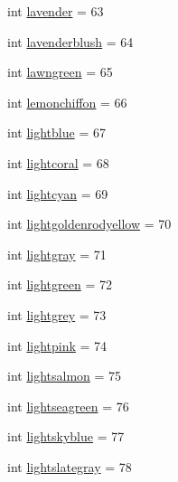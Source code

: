 \begin{DoxyCompactItemize}
\item 
int \mbox{\hyperlink{classbridges_1_1named__color_1_1_named_color_aa7424f36843ba0a7712836bddb048e64}{lavender}} = 63
\item 
int \mbox{\hyperlink{classbridges_1_1named__color_1_1_named_color_a9c3db166dddbac046a0fcc51d0285864}{lavenderblush}} = 64
\item 
int \mbox{\hyperlink{classbridges_1_1named__color_1_1_named_color_a2c267420ee73d46609a48db2d78fc843}{lawngreen}} = 65
\item 
int \mbox{\hyperlink{classbridges_1_1named__color_1_1_named_color_a77e4011bdf8fc70456c2ff197b78d7b5}{lemonchiffon}} = 66
\item 
int \mbox{\hyperlink{classbridges_1_1named__color_1_1_named_color_a66aba171251724a6fc4ba180a4ff78d6}{lightblue}} = 67
\item 
int \mbox{\hyperlink{classbridges_1_1named__color_1_1_named_color_a35c91829cf18d0f8a2892411bae23eda}{lightcoral}} = 68
\item 
int \mbox{\hyperlink{classbridges_1_1named__color_1_1_named_color_af52d155b6ef4eed72f56f95df59d9125}{lightcyan}} = 69
\item 
int \mbox{\hyperlink{classbridges_1_1named__color_1_1_named_color_a316d825baa9306e4f3ccb9aabbe0a6cc}{lightgoldenrodyellow}} = 70
\item 
int \mbox{\hyperlink{classbridges_1_1named__color_1_1_named_color_a02eb80e807d44dbb233cf8f217971a70}{lightgray}} = 71
\item 
int \mbox{\hyperlink{classbridges_1_1named__color_1_1_named_color_a600e096299c61ae9a2997534aee92271}{lightgreen}} = 72
\item 
int \mbox{\hyperlink{classbridges_1_1named__color_1_1_named_color_a14d7aa8be4da1dc0d695e1403a3ae47e}{lightgrey}} = 73
\item 
int \mbox{\hyperlink{classbridges_1_1named__color_1_1_named_color_a32e9e9491919f01f236ce0447abb5bfa}{lightpink}} = 74
\item 
int \mbox{\hyperlink{classbridges_1_1named__color_1_1_named_color_a616e82749b8c7711ede2554ce8e3a879}{lightsalmon}} = 75
\item 
int \mbox{\hyperlink{classbridges_1_1named__color_1_1_named_color_a05e129daa9b269d445da99ef16518fa1}{lightseagreen}} = 76
\item 
int \mbox{\hyperlink{classbridges_1_1named__color_1_1_named_color_aca6606444ac438d10f442d13e2daa475}{lightskyblue}} = 77
\item 
int \mbox{\hyperlink{classbridges_1_1named__color_1_1_named_color_aa7f81bd8d7d793a8b77487153fb6affe}{lightslategray}} = 78

\end{DoxyCompactItemize}

